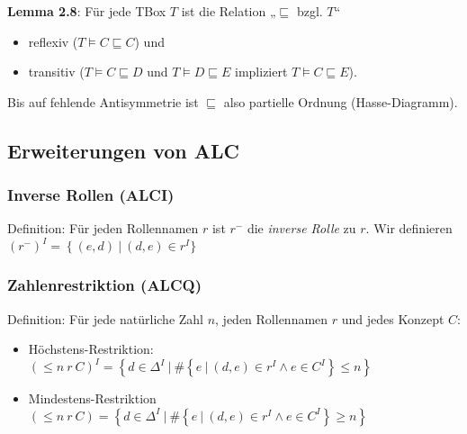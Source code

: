 \textbf{Lemma 2.8}: Für jede TBox $T$ ist die Relation
„$\sqsubseteq$ bzgl. $T$``

\begin{itemize}
\item
  reflexiv ($T \vDash C \sqsubseteq C$) und
\item
  transitiv ($T \vDash C \sqsubseteq D$ und
  $T \vDash D \sqsubseteq E$ impliziert $T \vDash C \sqsubseteq E$).
\end{itemize}

Bis auf fehlende Antisymmetrie ist $\sqsubseteq$ also partielle
Ordnung (Hasse-Diagramm).

\subsection{Erweiterungen von ALC}\label{erweiterungen-von-alc}

\subsubsection{Inverse Rollen (ALCI)}\label{inverse-rollen-alci}

Definition: Für jeden Rollennamen $r$ ist $r^{-}$ die \emph{inverse
Rolle} zu $r$. Wir definieren
$\left( r^{-} \right)^{I} = \left\{ \left( e,d \right)\  \right|\ \left( d,e \right) \in r^{I}\}$

\subsubsection{Zahlenrestriktion (ALCQ)}\label{zahlenrestriktion-alcq}

Definition: Für jede natürliche Zahl $n$, jeden Rollennamen $r$ und
jedes Konzept $C$:

\begin{itemize}
\item
  Höchstens-Restriktion:
  $\left( \leq n\ r\ C \right)^{I} = \left\{ d \in \Delta^{I}\ |\ \#\left\{ e\ |\ \left( d,e \right) \in r^{I} \land e \in C^{I} \right\} \leq n \right\}$
\item
  Mindestens-Restriktion
  $( \leq n\ r\ C) = \left\{ d \in \Delta^{I}\ |\ \#\left\{ e\ |\ \left( d,e \right) \in r^{I} \land e \in C^{I} \right\} \geq n \right\}$
\end{itemize}